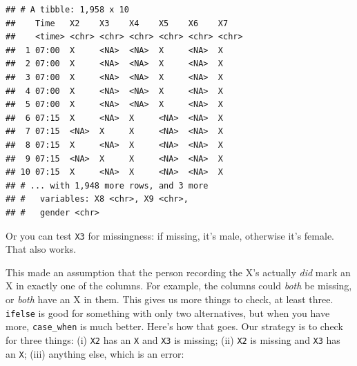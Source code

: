 \documentclass[]{tufte-book}
\newenvironment{Shaded}{}{}
\newcommand{\DataTypeTok}[1]{\textcolor[rgb]{0.56,0.13,0.00}{#1}}
\newcommand{\KeywordTok}[1]{\textcolor[rgb]{0.00,0.44,0.13}{\textbf{#1}}}
\newcommand{\NormalTok}[1]{#1}
\newcommand{\OperatorTok}[1]{\textcolor[rgb]{0.40,0.40,0.40}{#1}}
\newcommand{\OtherTok}[1]{\textcolor[rgb]{0.00,0.44,0.13}{#1}}
\newcommand{\StringTok}[1]{\textcolor[rgb]{0.25,0.44,0.63}{#1}}
\theoremstyle{definition}
\theoremstyle{definition}
\theoremstyle{definition}
\theoremstyle{remark}
\begin{document}
\begin{verbatim}
## # A tibble: 1,958 x 10
##    Time   X2    X3    X4    X5    X6    X7   
##    <time> <chr> <chr> <chr> <chr> <chr> <chr>
##  1 07:00  X     <NA>  <NA>  X     <NA>  X    
##  2 07:00  X     <NA>  <NA>  X     <NA>  X    
##  3 07:00  X     <NA>  <NA>  X     <NA>  X    
##  4 07:00  X     <NA>  <NA>  X     <NA>  X    
##  5 07:00  X     <NA>  <NA>  X     <NA>  X    
##  6 07:15  X     <NA>  X     <NA>  <NA>  X    
##  7 07:15  <NA>  X     X     <NA>  <NA>  X    
##  8 07:15  X     <NA>  X     <NA>  <NA>  X    
##  9 07:15  <NA>  X     X     <NA>  <NA>  X    
## 10 07:15  X     <NA>  X     <NA>  <NA>  X    
## # ... with 1,948 more rows, and 3 more
## #   variables: X8 <chr>, X9 <chr>,
## #   gender <chr>
\end{verbatim}

Or you can test \texttt{X3} for missingness: if missing, it's male,
otherwise it's female. That also works.

This made an assumption that the person recording the X's actually
\emph{did} mark an X in exactly one of the columns. For example, the
columns could \emph{both} be missing, or \emph{both} have an X in them.
This gives us more things to check, at least three. \texttt{ifelse} is
good for something with only two alternatives, but when you have more,
\texttt{case\_when} is much better.
Here's how that goes. Our strategy is to check for three things: (i)
\texttt{X2} has an \texttt{X} and \texttt{X3} is missing; (ii)
\texttt{X2} is missing and \texttt{X3} has an \texttt{X}; (iii) anything
else, which is an error:

\begin{Shaded}
\end{Shaded}
\end{document}

